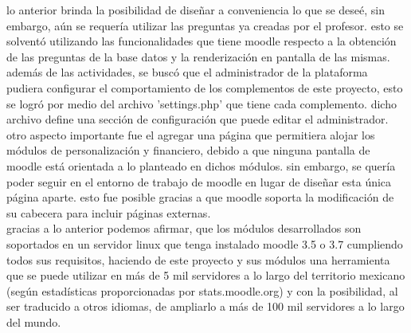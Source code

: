 \noindent lo anterior brinda la posibilidad de diseñar a conveniencia lo que se deseé, sin embargo, aún se requería utilizar las preguntas
ya creadas por el profesor. esto se solventó utilizando las funcionalidades que tiene moodle respecto a la obtención de las preguntas
de la base datos y la renderización en pantalla de las mismas.\\

\noindent además de las actividades, se buscó que el administrador de la plataforma pudiera configurar el comportamiento
de los complementos de este proyecto, esto se logró por medio del archivo 'settings.php' que tiene cada complemento. dicho archivo
define una sección de configuración que puede editar el administrador.\\

\noindent otro aspecto importante fue el agregar una página que permitiera alojar los módulos de personalización y financiero, 
debido a que ninguna pantalla de moodle está orientada a lo planteado en dichos módulos. sin embargo, se quería poder seguir en el entorno de trabajo
de moodle en lugar de diseñar esta única página aparte. esto fue posible gracias a que moodle soporta la modificación
de su cabecera para incluir páginas externas.\\

\noindent gracias a lo anterior podemos afirmar, que los módulos desarrollados son soportados en un
servidor linux que tenga instalado moodle 3.5 o 3.7 cumpliendo todos sus requisitos, haciendo de este proyecto y sus módulos una herramienta que se puede utilizar
en más de 5 mil servidores a lo largo del territorio mexicano (según estadísticas proporcionadas por stats.moodle.org) y con la posibilidad,
al ser traducido a otros idiomas, de ampliarlo a más de 100 mil servidores a lo largo del mundo.\\

